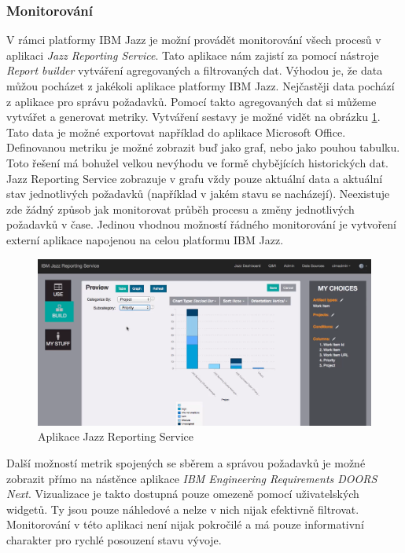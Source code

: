 \documentclass[czech,master,public,dept460,male,cpdeclaration,oneside]{diploma}
\begin{document}
\subsubsection{Monitorování}
V rámci platformy IBM Jazz je možní provádět monitorování všech procesů v aplikaci \textit{Jazz Reporting Service}. Tato aplikace nám zajistí za pomocí nástroje \textit{Report builder} vytváření agregovaných a filtrovaných dat. Výhodou je, že data můžou pocházet z jakékoli aplikace platformy IBM Jazz. Nejčastěji data pochází z aplikace pro správu požadavků. Pomocí takto agregovaných dat si můžeme vytvářet a generovat metriky. Vytváření sestavy je možné vidět na obrázku \ref{fig:ibm_reporting_service}. Tato data je možné exportovat například do aplikace Microsoft Office. Definovanou metriku je možné zobrazit buď jako graf, nebo jako pouhou tabulku. Toto řešení má bohužel velkou nevýhodu ve formě chybějících historických dat. Jazz Reporting Service zobrazuje v grafu vždy pouze aktuální data a aktuální stav jednotlivých požadavků (například v jakém stavu se nacházejí). Neexistuje zde žádný způsob jak monitorovat průběh procesu a změny jednotlivých požadavků v čase. Jedinou vhodnou možností řádného monitorování je vytvoření externí aplikace napojenou na celou platformu IBM Jazz.

\begin{figure}[!ht]
    \centering
    \includegraphics[width=1\textwidth]{Diplomka/Figures/ibm_reporting_service.png}
    \caption{Aplikace Jazz Reporting Service}
    \label{fig:ibm_reporting_service}
\end{figure}

Další možností metrik spojených se sběrem a správou požadavků je možné zobrazit přímo na nástěnce aplikace \textit{IBM Engineering Requirements DOORS Next}. Vizualizace je takto dostupná pouze omezeně pomocí uživatelských widgetů. Ty jsou pouze náhledové a nelze v nich nijak efektivně filtrovat. Monitorování v této aplikaci není nijak pokročilé a má pouze informativní charakter pro rychlé posouzení stavu vývoje.
\end{document}
